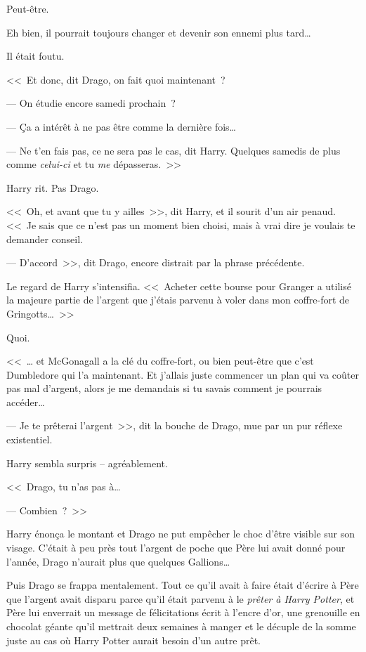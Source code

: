 Peut-être.

Eh bien, il pourrait toujours changer et devenir son ennemi plus tard…

Il était foutu.

<<~Et donc, dit Drago, on fait quoi maintenant~?

--- On étudie encore samedi prochain~?

--- Ça a intérêt à ne pas être comme la dernière fois…

--- Ne t'en fais pas, ce ne sera pas le cas, dit Harry. Quelques samedis de plus comme \emph{celui-ci} et tu \emph{me} dépasseras.~>>

Harry rit. Pas Drago.

<<~Oh, et avant que tu y ailles~>>, dit Harry, et il sourit d'un air penaud. <<~Je sais que ce n'est pas un moment bien choisi, mais à vrai dire je voulais te demander conseil.

--- D'accord~>>, dit Drago, encore distrait par la phrase précédente.

Le regard de Harry s'intensifia. <<~Acheter cette bourse pour Granger a utilisé la majeure partie de l'argent que j'étais parvenu à voler dans mon coffre-fort de Gringotts…~>>

Quoi.

<<~… et McGonagall a la clé du coffre-fort, ou bien peut-être que c'est Dumbledore qui l'a maintenant. Et j'allais juste commencer un plan qui va coûter pas mal d'argent, alors je me demandais si tu savais comment je pourrais accéder…

--- Je te prêterai l'argent~>>, dit la bouche de Drago, mue par un pur réflexe existentiel.

Harry sembla surpris -- agréablement.

<<~Drago, tu n'as pas à…

--- Combien~?~>>

Harry énonça le montant et Drago ne put empêcher le choc d'être visible sur son visage. C'était à peu près tout l'argent de poche que Père lui avait donné pour l'année, Drago n'aurait plus que quelques Gallions…

Puis Drago se frappa mentalement. Tout ce qu'il avait à faire était d'écrire à Père que l'argent avait disparu parce qu'il était parvenu à le \emph{prêter à Harry Potter}, et Père lui enverrait un message de félicitations écrit à l'encre d'or, une grenouille en chocolat géante qu'il mettrait deux semaines à manger et le décuple de la somme juste au cas où Harry Potter aurait besoin d'un autre prêt.

